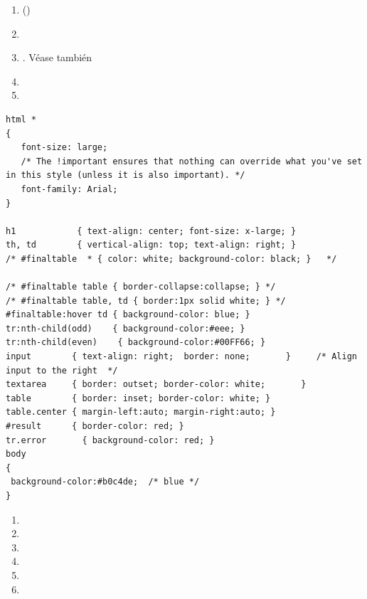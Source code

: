 \begin{enumerate}
\item 
{} ()
\item {}
\item 
{}.
Véase también \cite{pilgrimhtml5}
\item {}
\item {}
\end{enumerate}

\begin{verbatim}
html *
{
   font-size: large; 
   /* The !important ensures that nothing can override what you've set in this style (unless it is also important). */
   font-family: Arial;
}

h1            { text-align: center; font-size: x-large; }
th, td        { vertical-align: top; text-align: right; }   
/* #finaltable  * { color: white; background-color: black; }   */

/* #finaltable table { border-collapse:collapse; } */
/* #finaltable table, td { border:1px solid white; } */
#finaltable:hover td { background-color: blue; } 
tr:nth-child(odd)    { background-color:#eee; }
tr:nth-child(even)    { background-color:#00FF66; }
input        { text-align: right;  border: none;       }     /* Align input to the right  */
textarea     { border: outset; border-color: white;       }                        
table        { border: inset; border-color: white; }
table.center { margin-left:auto; margin-right:auto; }
#result      { border-color: red; }
tr.error       { background-color: red; }
body
{
 background-color:#b0c4de;  /* blue */
}
\end{verbatim}

\begin{enumerate}
\item 
{}
\item 
{}
\item 
{}
\item 
{}
\item 
{}
\item 
\end{enumerate}


